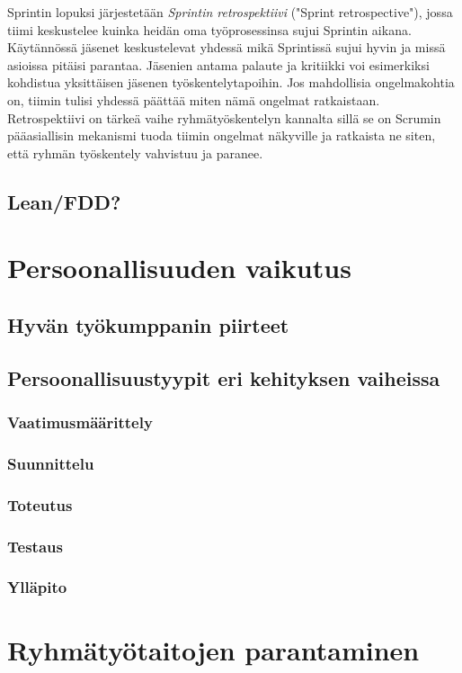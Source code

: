 \documentclass[finnish]{../tktltiki2}
\theoremstyle{definition}
\theoremstyle{remark}
\begin{document}
Sprintin lopuksi järjestetään \emph{Sprintin retrospektiivi}
("Sprint retrospective"), jossa tiimi keskustelee kuinka heidän
oma työprosessinsa sujui Sprintin aikana. Käytännössä jäsenet
keskustelevat yhdessä mikä Sprintissä sujui hyvin ja missä
asioissa pitäisi parantaa. Jäsenien antama palaute ja kritiikki
voi esimerkiksi kohdistua yksittäisen jäsenen työskentelytapoihin.
Jos mahdollisia ongelmakohtia on, tiimin tulisi yhdessä päättää
miten nämä ongelmat ratkaistaan. Retrospektiivi on tärkeä vaihe
ryhmätyöskentelyn kannalta sillä se on Scrumin pääasiallisin
mekanismi tuoda tiimin ongelmat näkyville ja ratkaista ne siten,
että ryhmän työskentely vahvistuu ja paranee.~\cite{Scrumprimer}

\subsection{Lean/FDD?}

\section{Persoonallisuuden vaikutus}

\subsection{Hyvän työkumppanin piirteet}

\subsection{Persoonallisuustyypit eri kehityksen vaiheissa}

\subsubsection{Vaatimusmäärittely}
\subsubsection{Suunnittelu}
\subsubsection{Toteutus}
\subsubsection{Testaus}
\subsubsection{Ylläpito}

\section{Ryhmätyötaitojen parantaminen}


%
%
% 
%



\end{document}
